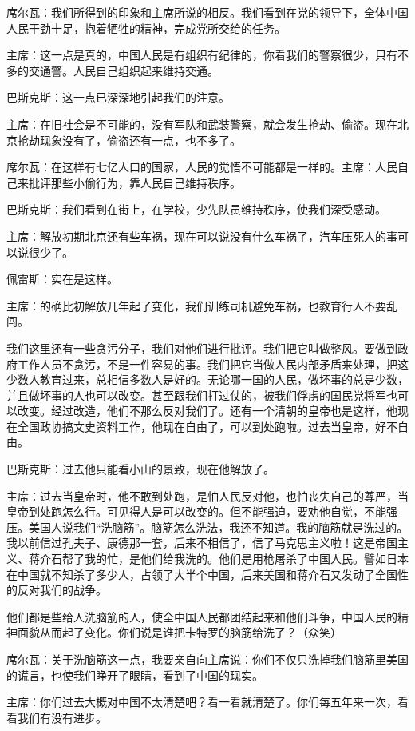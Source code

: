 席尔瓦：我们所得到的印象和主席所说的相反。我们看到在党的领导下，全体中国人民干劲十足，抱着牺牲的精神，完成党所交给的任务。

主席：这一点是真的，中国人民是有组织有纪律的，你看我们的警察很少，只有不多的交通警。人民自己组织起来维持交通。

巴斯克斯：这一点已深深地引起我们的注意。

主席：在旧社会是不可能的，没有军队和武装警察，就会发生抢劫、偷盗。现在北京抢劫现象没有了，偷盗还有一点，也不多了。

席尔瓦：在这样有七亿人口的国家，人民的觉悟不可能都是一样的。主席：人民自己来批评那些小偷行为，靠人民自己维持秩序。

巴斯克斯：我们看到在街上，在学校，少先队员维持秩序，使我们深受感动。

主席：解放初期北京还有些车祸，现在可以说没有什么车祸了，汽车压死人的事可以说很少了。

佩雷斯：实在是这样。

主席：的确比初解放几年起了变化，我们训练司机避免车祸，也教育行人不要乱闯。

我们这里还有一些贪污分子，我们对他们进行批评。我们把它叫做整风。要做到政府工作人员不贪污，不是一件容易的事。我们把它当做人民内部矛盾来处理，把这少数人教育过来，总相信多数人是好的。无论哪一国的人民，做坏事的总是少数，并且做坏事的人也可以改变。甚至跟我们打过仗的，被我们俘虏的国民党将军也可以改变。经过改造，他们不那么反对我们了。还有一个清朝的皇帝也是这样，他现在全国政协搞文史资料工作，他现在自由了，可以到处跑啦。过去当皇帝，好不自由。

巴斯克斯：过去他只能看小山的景致，现在他解放了。

主席：过去当皇帝时，他不敢到处跑，是怕人民反对他，也怕丧失自己的尊严，当皇帝到处跑怎么行。可见得人是可以改变的。但不能强迫，要劝他自觉，不能强压。美国人说我们“洗脑筋”。脑筋怎么洗法，我还不知道。我的脑筋就是洗过的。我以前信过孔夫子、康德那一套，后来不相信了，信了马克思主义啦！这是帝国主义、蒋介石帮了我的忙，是他们给我洗的。他们是用枪屠杀了中国人民。譬如日本在中国就不知杀了多少人，占领了大半个中国，后来美国和蒋介石又发动了全国性的反对我们的战争。

他们都是些给人洗脑筋的人，使全中国人民都团结起来和他们斗争，中国人民的精神面貌从而起了变化。你们说是谁把卡特罗的脑筋给洗了？（众笑）

席尔瓦：关于洗脑筋这一点，我要亲自向主席说：你们不仅只洗掉我们脑筋里美国的谎言，也使我们睁开了眼睛，看到了中国的现实。

主席：你们过去大概对中国不太清楚吧？看一看就清楚了。你们每五年来一次，看看我们有没有进步。

